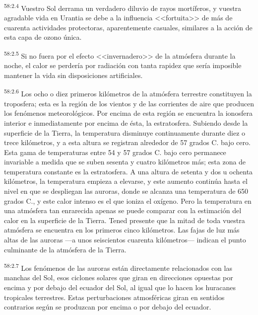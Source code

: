 \par
\textsuperscript{58:2.4} Vuestro Sol derrama un verdadero diluvio de rayos mortíferos, y vuestra agradable vida en Urantia se debe a la influencia <<fortuita>> de más de cuarenta actividades protectoras, aparentemente casuales, similares a la acción de esta capa de ozono única.

\par
\textsuperscript{58:2.5} Si no fuera por el efecto <<invernadero>> de la atmósfera durante la noche, el calor se perdería por radiación con tanta rapidez que sería imposible mantener la vida sin disposiciones artificiales.

\par
\textsuperscript{58:2.6} Los ocho o diez primeros kilómetros de la atmósfera terrestre constituyen la troposfera; esta es la región de los vientos y de las corrientes de aire que producen los fenómenos meteorológicos. Por encima de esta región se encuentra la ionosfera interior e inmediatamente por encima de ésta, la estratosfera. Subiendo desde la superficie de la Tierra, la temperatura disminuye continuamente durante diez o trece kilómetros, y a esta altura se registran alrededor de 57 grados C. bajo cero. Esta gama de temperaturas entre
54 y 57 grados C. bajo cero permanece invariable a medida que se suben sesenta y cuatro kilómetros más; esta zona de temperatura constante es la estratosfera. A una altura de setenta y dos u ochenta kilómetros, la temperatura empieza a elevarse, y este aumento continúa hasta el nivel en que se despliegan las auroras, donde se alcanza una temperatura de 650 grados C., y este calor intenso es el que ioniza el oxígeno. Pero la temperatura en una atmósfera tan enrarecida apenas se puede comparar con la estimación del calor en la superficie de la Tierra. Tened presente que la mitad de toda vuestra atmósfera se encuentra en los primeros cinco kilómetros. Las fajas de luz más altas de las auroras ---a unos seiscientos cuarenta kilómetros--- indican el punto culminante de la atmósfera de la Tierra.

\par
\textsuperscript{58:2.7} Los fenómenos de las auroras están directamente relacionados con las manchas del Sol, esos ciclones solares que giran en direcciones opuestas por encima y por debajo del ecuador del Sol, al igual que lo hacen los huracanes tropicales terrestres. Estas perturbaciones atmosféricas giran en sentidos contrarios según se produzcan por encima o por debajo del ecuador.

